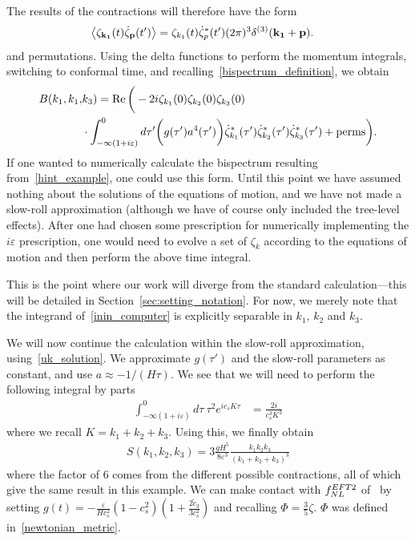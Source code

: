 The results of the contractions will therefore have the form
\begin{align}
    \left<\zeta_{\mathbf{k_1}}(t)\dot{\zeta}_{\mathbf{p}}(t')\right>
    &= \zeta_{k_1}(t)\dot{\zeta}^*_{p}(t')(2\pi)^3\delta^{(3)}(\mathbf{k_1}+\mathbf{p}).
\end{align}
and permutations.
Using the delta functions to perform the momentum integrals,
switching to conformal time,
and recalling~\eqref{bispectrum_definition}, we obtain
\begin{align}\label{inin_computer}
    B(k_1, k_1,&k_3)
    =
    \operatorname{Re}\bigg(-2i \zeta_{k_1}(0)\zeta_{k_2}(0)\zeta_{k_3}(0)\nonumber\\
    &\cdot\int_{-\infty(1+i\varepsilon)}^{0}d\tau'\bigg(g(\tau') a^4(\tau')\bigg)
    \dot{\zeta}^*_{k_1}(\tau')
    \dot{\zeta}^*_{k_2}(\tau')
    \dot{\zeta}^*_{k_3}(\tau')
    +\text{perms}
    \bigg).
\end{align}
If one wanted to numerically calculate the bispectrum resulting from~\eqref{hint_example},
one could use this form. Until this point we have assumed nothing about the solutions of the
equations of motion, and we have not made a slow-roll approximation (although we have
of course only included the tree-level effects).
After one had chosen some prescription for numerically implementing the
$i\varepsilon$ prescription, one would need to evolve a set of $\zeta_{k}$
according to the equations of motion and then perform the above time integral.


This is the point where our work will diverge from the standard calculation---this
will be detailed in Section~\ref{sec:setting_notation}. For now, we merely note that
the integrand of~\eqref{inin_computer} is explicitly separable in $k_1$, $k_2$ and $k_3$.


We will now continue the calculation within the slow-roll approximation,
using~\eqref{uk_solution}. We approximate $g(\tau')$ and the slow-roll
parameters as constant, and use $a\approx-1/(H\tau)$.
We see that we will need to perform the following integral by parts
\begin{align}\label{ieps_integral}
    \int_{-\infty(1+i\varepsilon)}^{0}d\tau~\tau^2 e^{ic_sK\tau}
    &= \frac{2i}{c_s^3K^3}
\end{align}
where we recall $K=k_1+k_2+k_3$.
Using this, we finally obtain
\begin{align}
    S(k_1, k_2, k_3) = 3\frac{g H^5}{8\varepsilon^3}\frac{k_1k_2k_3}{(k_1+k_2+k_3)^3}
\end{align}
where the factor of $6$ comes from the different possible contractions, all
of which give the same result in this example.
We can make contact with $f_{NL}^{EFT2}$ of~\cite{Planck_NG_2018, Senatore_wmap_2009}
by setting $g(t)=-\frac{\varepsilon}{Hc_s^2}(1-c_s^2)\left(1+\frac{2\tilde{c}_3}{3c_s^2}\right)$
and recalling $\Phi=\frac{3}{5}\zeta$.
$\Phi$ was defined in~\eqref{newtonian_metric}.


